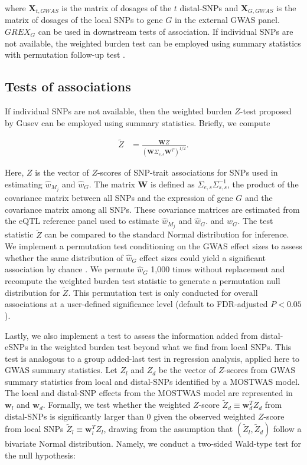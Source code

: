 \noindent where $\mathbf{X}_{t,GWAS}$ is the matrix of dosages of the
$t$ distal-SNPs and $\mathbf{X}_{G,GWAS}$ is the matrix of 
dosages of the local SNPs to gene $G$ in the external GWAS
panel. $GREX_G$ can be used in downstream tests of association.
If individual SNPs are not available, the weighted
burden test can be employed using summary statistics with
permutation follow-up
test \cite{Gusev2016}.

\subsection{Tests of associations}


If individual SNPs are not available, then the weighted burden
$Z$-test proposed by Gusev \etal{} can be employed \cite{Gusev2016} 
using
summary statistics. Briefly, we compute

\begin{equation}\label{wbtest}
\begin{split}
\tilde{Z} & = \frac{\mathbf{W}Z}{(\mathbf{W}\Sigma_{s,s}\mathbf{W}^T)^{1/2}}.
\end{split}
\end{equation}

Here, $Z$ is the vector of $Z$-scores of SNP-trait
associations for SNPs used in estimating $\hat{w}_{M_j}$
and $\hat{w}_G$. The matrix $\mathbf{W}$ is defined as 
$\Sigma_{e,s}\Sigma_{s,s}^{-1}$, the product of
the covariance matrix between all SNPs
and the expression of gene $G$ and the covariance
matrix among all SNPs. These covariance matrices
are estimated from the eQTL reference panel used to estimate
$\hat{w}_{M_j}$
and $\hat{w}_G$.
and $\hat{w}_G$. The test statistic $\tilde{Z}$
can be compared to the standard Normal distribution
for inference.
We implement a permutation
test conditioning
on the GWAS effect sizes to assess
whether the same distribution
of $\hat{w}_G$ effect
sizes could yield a significant
association by chance \cite{Gusev2016}. 
We
permute $\hat{w}_G$ 1,000
times without replacement
and recompute the weighted
burden test statistic
to generate a permutation
null distribution for $\tilde{Z}$.
This permutation test
is only conducted for
overall associations
at a user-defined significance
level (default to FDR-adjusted $P < 0.05$). 

Lastly, we also 
implement a test to assess
the information added from distal-eSNPs
in the weighted burden test beyond
what we find from local SNPs.
This test is analogous to a group added-last test in regression
analysis, applied here to GWAS summary statistics.
Let $Z_l$ and 
$Z_d$  be the vector of $Z$-scores
from GWAS summary statistics
from
local and distal-SNPs identified
by a MOSTWAS model. 
The local
and distal-SNP effects
from the MOSTWAS model are represented
in $\mathbf{w}_l$ and 
$\mathbf{w}_d$.
Formally, we test
whether the weighted $Z$-score $\tilde{Z}_d \equiv \mathbf{w}_d^TZ_d$
from distal-SNPs is significantly
larger than 0 given the observed
weighted $Z$-score from local SNPs $\tilde{Z}_{l} \equiv \mathbf{w}_l^TZ_l$,
drawing from the assumption that
$(\tilde{Z}_l,\tilde{Z}_d)$
follow a bivariate Normal distribution. Namely, we
conduct a two-sided
Wald-type test for the null
hypothesis:

